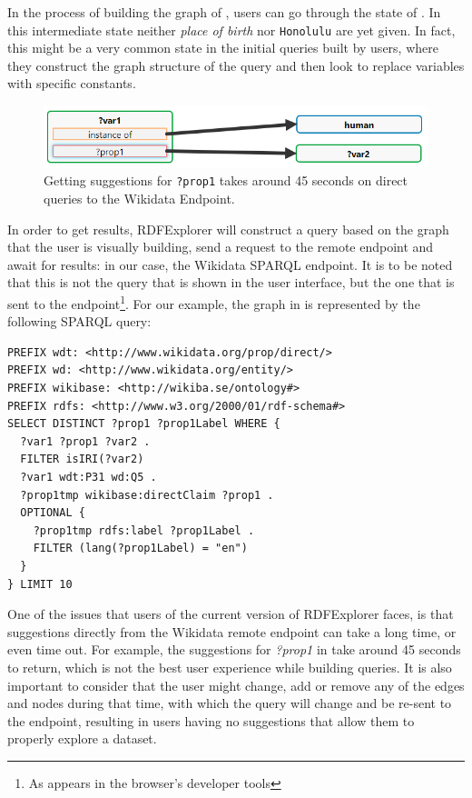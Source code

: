 In the process of building the graph of , users can go through the state of . 
In this intermediate state neither \textit{place of birth} nor \texttt{Honolulu} are yet given. 
In fact, this might be a very common state in the initial queries built by users, where they construct the graph structure of the query and then look to replace variables with specific constants. 

\begin{figure}[h]
    \centering
        \includegraphics[width=0.8\linewidth]{imagenes/near timeout query.png}
        \caption{Getting suggestions for \texttt{?prop1} takes around 45 seconds on direct queries to the Wikidata Endpoint.}
        \label{fig:rdfExplorer_nearTimeout}
\end{figure}

In order to get results, RDFExplorer will construct a query based on the graph that the user is visually building, send a request to the remote endpoint and await for results: in our case, the Wikidata SPARQL endpoint. 
It is to be noted that this is not the query that is shown in the user interface, but the one that is sent to the endpoint\footnote{As appears in the browser's developer tools}. 
For our example, the graph in  is represented by the following SPARQL query:

\begin{verbatim}
PREFIX wdt: <http://www.wikidata.org/prop/direct/>
PREFIX wd: <http://www.wikidata.org/entity/>
PREFIX wikibase: <http://wikiba.se/ontology#>
PREFIX rdfs: <http://www.w3.org/2000/01/rdf-schema#>
SELECT DISTINCT ?prop1 ?prop1Label WHERE {
  ?var1 ?prop1 ?var2 .
  FILTER isIRI(?var2)
  ?var1 wdt:P31 wd:Q5 .
  ?prop1tmp wikibase:directClaim ?prop1 .
  OPTIONAL {
    ?prop1tmp rdfs:label ?prop1Label .
    FILTER (lang(?prop1Label) = "en")
  }
} LIMIT 10
\end{verbatim}

One of the issues that users of the current version of RDFExplorer faces, is that suggestions directly from the Wikidata remote endpoint can take a long time, or even time out. For example, the suggestions for \textit{?prop1} in  take around 45 seconds to return, which is not the best user experience while building queries. It is also important to consider that the user might change, add or remove any of the edges and nodes during that time, with which the query will change and be re-sent to the endpoint, resulting in users having no suggestions that allow them to properly explore a dataset. 

